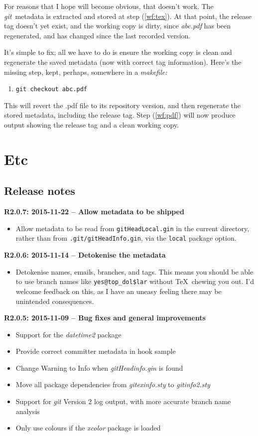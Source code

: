 \documentclass[a4paper,12pt,twoside,openany]{memoir}
\newcommand{\rpara}[1]{\par\noindent\textbf{#1}\,}
\newcommand{\sfit}[1]{\textit{#1}}
\newcommand{\git}{\sfit{git}}
\newcommand{\ginname}{gitHeadInfo.gin}
\newcommand{\locname}{\texttt{gitHeadLocal.gin}}
\newcommand{\metapath}{\texttt{.git/\ginname}}
\begin{document}
\noindent For reasons that I hope will become obvious,
that doesn't work.
The \git\ metadata is extracted and stored at step (\ref{wf:tex}).
At that point, the release tag doesn't yet exist,
and the working copy is dirty,
since \sfit{abc.pdf} has been regenerated, and has changed
since the last recorded version.

It's simple to fix; all we have to do is
ensure the working copy is clean and regenerate
the saved metadata (now with correct tag information).
Here's the missing step, kept, perhaps, somewhere in a \sfit{makefile:}

\begin{enumerate}
\item[\ref{wf:git}.] \texttt{git checkout abc.pdf}
\end{enumerate}

\noindent This will revert the .pdf file to its repository version,
and then regenerate the stored metadata,
including the release tag.
Step (\ref{wf:pdf}) will now produce output showing the release tag
and a clean working copy.
\chapter{Etc}
\section{Release notes}

\rpara{R2.0.7: 2015-11-22 -- Allow metadata to be shipped}
\begin{itemize}
\item 
Allow metadata to be read 
from \texttt{\locname} in the current directory,
rather than from \metapath, 
via the \texttt{local} package option. 
\end{itemize}

\rpara{R2.0.6: 2015-11-14 -- Detokenise the metadata}
\begin{itemize}
\item Detokenise names, emails, branches, and tags.
This means you should be able to use branch names like \verb!yes@top_dol$lar! without 
\TeX\ chewing you out.
I'd welcome feedback on this, 
as I have an uneasy feeling there may be unintended consequences.
\end{itemize}

\rpara{R2.0.5: 2015-11-09 -- Bug fixes and general improvements}
\begin{itemize}
\item Support for the \sfit{datetime2} package
\item Provide correct committer metadata in hook sample
\item Change Warning to Info when \sfit{gitHeadinfo.gin} is found
\item Move all package dependencies from \sfit{gitexinfo.sty} to \sfit{gitinfo2.sty}
\item Support for \git{} Version 2 log output, with more accurate branch name analysis
\item Only use colours if the \sfit{xcolor} package is loaded
\end{itemize}
\end{document}
